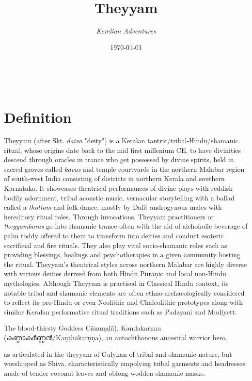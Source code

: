 \documentclass[a4paper, 11pt]{article} %
\title{\textbf{Theyyam}} %
\author{\textit{Kerelian Adventures}} %
\date{\today} %
\makeatletter
\renewcommand{\maketitle}{ %
\begin{flushright} %
{\LARGE\@title} %

\vspace{10pt} %

{\@author} %
\\\@date %

\vspace{30pt} %
\end{flushright}
}
\makeatother
\begin{document}
\maketitle %

\thispagestyle{empty}


\section{Definition}
  \label{sec:Definition}

Theyyam (after Skt. \textit{daiva} "deity") is a Keralan tantric/tribal-Hindu/shamanic ritual, whose origins date back to the mid first millenium CE, to have divinities descend through oracles in trance who get possessed by divine spirits, held in sacred groves called \textit{kavus} and temple courtyards in the northern Malabar region of south-west India consisting of districts in northern Kerala and southern Karnataka. It showcases theatrical performances of divine plays with reddish bodily adornment, tribal acoustic music, vernacular storytelling with a ballad called a \textit{thottam} and folk dance, mostly by Dalit androgynous males with hereditory ritual roles. Through invocations, Theyyam practitioners or \textit{theyyamkaras} go into shamanic trance often with the aid of alchoholic beverage of palm toddy offered to them to transform into deities and conduct esoteric sacrificial and fire rituals. They also play vital socio-shamanic roles such as providing blessings, healings and psychotherapies in a given community hosting the ritual. Theyyam's theatrical styles across northern Malabar are highly diverse with various deities derived from both Hindu Purāṇic and local non-Hindu mythologies. Although Theyyam is practised in Classical Hindu context, its notable tribal and shamanic elements are often ethno-archaeologically considered to reflect its pre-Hindu or even Neolithic and Chalcolithic prototypes along with similar Keralan performative ritual traditions such as Padayani and Mudiyett.


The blood-thirsty Goddess Cāmuṇḍā), Kandakarnna (കണ്ഠാകർണ്ണൻ/Kaṇṭhākarṇṇa), an autochthonous ancestral warrior hero. 


as articulated in the theyyam of Gulykan of tribal and shamanic nature, but worshipped as Shiva, characteristically empolying tribal garments and headresses made of tender coconut leaves and oblong wodden shamanic masks.
\end{document}
